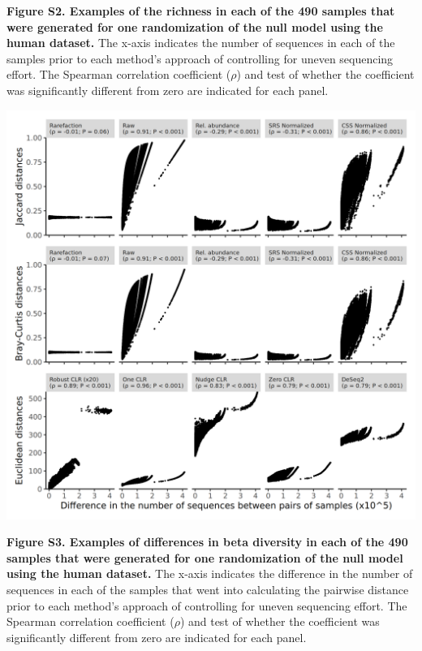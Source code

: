 \documentclass[
]{article}
\begin{document}
\textbf{Figure S2. Examples of the richness in each of the 490 samples
that were generated for one randomization of the null model using the
human dataset.} The x-axis indicates the number of sequences in each of
the samples prior to each method's approach of controlling for uneven
sequencing effort. The Spearman correlation coefficient (\(\rho\)) and
test of whether the coefficient was significantly different from zero
are indicated for each panel.

\newpage

\includegraphics{figure_s3.png}

\textbf{Figure S3. Examples of differences in beta diversity in each of
the 490 samples that were generated for one randomization of the null
model using the human dataset.} The x-axis indicates the difference in
the number of sequences in each of the samples that went into
calculating the pairwise distance prior to each method's approach of
controlling for uneven sequencing effort. The Spearman correlation
coefficient (\(\rho\)) and test of whether the coefficient was
significantly different from zero are indicated for each panel.
\end{document}
